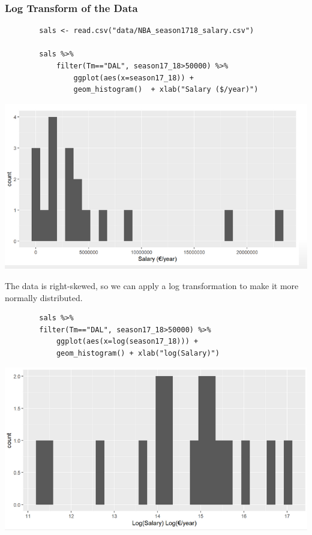 \documentclass[a4paper, 10pt]{article}
\begin{document}
\subsubsection{Log Transform of the Data}
\begin{examplebox}
    \begin{lstlisting}
        sals <- read.csv("data/NBA_season1718_salary.csv")

        sals %>% 
            filter(Tm=="DAL", season17_18>50000) %>% 
                ggplot(aes(x=season17_18)) + 
                geom_histogram()  + xlab("Salary ($/year)")
    \end{lstlisting}
    \begin{center}
        \includegraphics[scale=0.2]{images/nba_salaries.png}
    \end{center}
    The data is right-skewed, so we can apply a log transformation to make it more normally distributed.
    \begin{lstlisting}
        sals %>% 
        filter(Tm=="DAL", season17_18>50000) %>% 
            ggplot(aes(x=log(season17_18))) +
            geom_histogram() + xlab("log(Salary)")
    \end{lstlisting}
    \begin{center}
        \includegraphics[scale=0.2]{images/nba_log_salaries.png}
    \end{center}


\end{examplebox}
\end{document}
